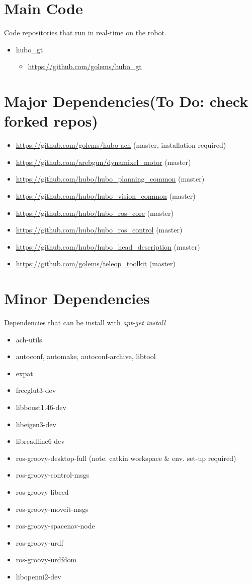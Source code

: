 \documentclass[letterpaper, 10 pt]{report}
\begin{document}
\section{Main Code}
Code repositories that run in real-time on the robot.
\begin{itemize}
\item hubo\_gt
  \begin{itemize}
	\item \url{https://github.com/golems/hubo_gt}
  \end{itemize}
\end{itemize}
\section{Major Dependencies(To Do: check forked repos)}
\begin{itemize}
  \item \url{https://github.com/golems/hubo-ach} (master, installation required)
  \item \url{https://github.com/arebgun/dynamixel_motor} (master)
  \item \url{https://github.com/hubo/hubo_planning_common} (master)
  \item \url{https://github.com/hubo/hubo_vision_common} (master)
  \item \url{https://github.com/hubo/hubo_ros_core} (master)
  \item \url{https://github.com/hubo/hubo_ros_control} (master)
  \item \url{https://github.com/hubo/hubo_head_description}
   (master)
  \item \url{https://github.com/golems/teleop_toolkit} (master)
\end{itemize}
\section{Minor Dependencies}
Dependencies that can be install with \textit{apt-get install}
\begin{itemize}
  \item ach-utils
  \item autoconf, automake, autoconf-archive, libtool
  \item expat
  \item freeglut3-dev
  \item libboost1.46-dev
  \item libeigen3-dev
  \item libreadline6-dev
  \item ros-groovy-desktop-full (note. catkin workspace \& env. set-up required)
  \item ros-groovy-control-msgs
  \item ros-groovy-libccd
  \item ros-groovy-moveit-msgs
  \item ros-groovy-spacenav-node
  \item ros-groovy-urdf
  \item ros-groovy-urdfdom
  \item libopenni2-dev
\end{itemize}
\end{document}
